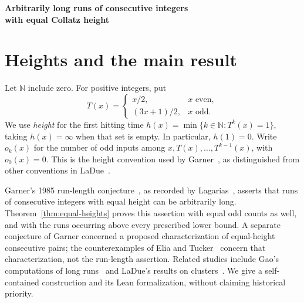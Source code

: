 \documentclass[11pt,a4paper]{article}
\begin{document}
\thispagestyle{plain}
\begin{center}
{\LARGE\bfseries Arbitrarily long runs of consecutive integers\\[3pt]
with equal Collatz height\par}
\vspace{8pt}{\large Lucas Valbuena\par}
\vspace{4pt}{\normalsize 28 September 2026}
\end{center}
\begin{abstract}
For every prescribed length and lower bound, we construct a larger
interval of consecutive positive integers that first reach one after
the same number of shortcut Collatz steps, with equal odd-step counts.
More generally, every finite pattern of nonnegative offsets has
arbitrarily large translates with these properties. The proof first
coalesces the pattern on a dyadic progression, then specializes its
common endpoint to a power of two. Equal first hitting times also
follow for the unshortened map. The principal statements and their
supporting lemmas are formalized in Lean~4. These results do not
establish convergence from an arbitrary prescribed starting integer.
\end{abstract}

\section{Heights and the main result}
Let $\mathbb N$ include zero. For positive integers, put
\[
T(x)=\begin{cases}x/2,&x\text{ even},\\(3x+1)/2,&x\text{ odd}.
\end{cases}
\]
We use \emph{height} for the first hitting time
$h(x)=\min\{k\in\mathbb N:T^k(x)=1\}$, taking $h(x)=\infty$
when that set is empty. In particular, $h(1)=0$.
Write $o_k(x)$ for the number of odd inputs among
$x,T(x),\ldots,T^{k-1}(x)$, with $o_0(x)=0$.
This is the height convention used by Garner~\cite{Garner1985},
as distinguished from other conventions in
LaDue~\cite[p.~156]{LaDue2018}.

Garner's 1985 run-length conjecture~\cite{Garner1985}, as recorded
by Lagarias~\cite[entry~72, p.~29]{Lagarias2011}, asserts that runs
of consecutive integers with equal height can be arbitrarily long.
Theorem~\ref{thm:equal-heights} proves this assertion with equal odd
counts as well, and with the runs occurring above every prescribed
lower bound. A separate conjecture of Garner concerned a proposed
characterization of equal-height consecutive pairs; the counterexamples
of Elia and Tucker~\cite{EliaTucker2015} concern that characterization,
not the run-length assertion. Related studies include Gao's computations
of long runs~\cite{Gao1993} and LaDue's results on
clusters~\cite{LaDue2018}. We give a self-contained construction and
its Lean formalization, without claiming historical priority.
\end{document}
